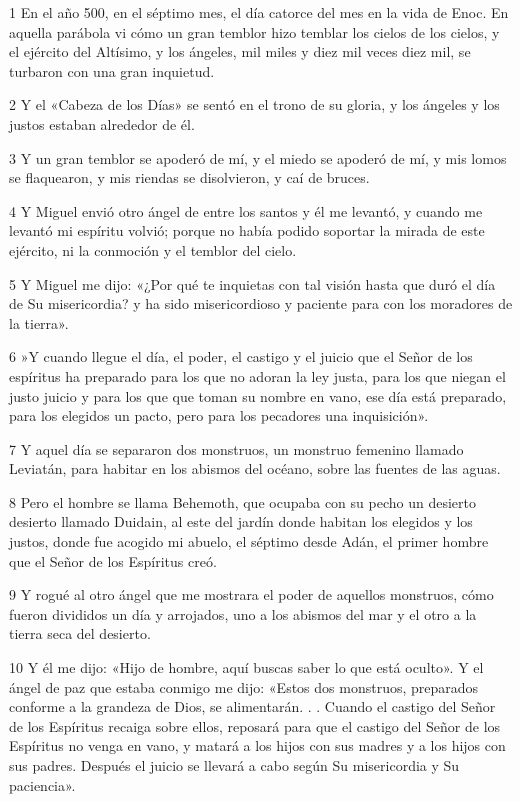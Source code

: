 \par 1 En el año 500, en el séptimo mes, el día catorce del mes en la vida de Enoc. En aquella parábola vi cómo un gran temblor hizo temblar los cielos de los cielos, y el ejército del Altísimo, y los ángeles, mil miles y diez mil veces diez mil, se turbaron con una gran inquietud.
\par 2 Y el «Cabeza de los Días» se sentó en el trono de su gloria, y los ángeles y los justos estaban alrededor de él.
\par 3 Y un gran temblor se apoderó de mí, y el miedo se apoderó de mí, y mis lomos se flaquearon, y mis riendas se disolvieron, y caí de bruces.
\par 4 Y Miguel envió otro ángel de entre los santos y él me levantó, y cuando me levantó mi espíritu volvió; porque no había podido soportar la mirada de este ejército, ni la conmoción y el temblor del cielo.
\par 5 Y Miguel me dijo: «¿Por qué te inquietas con tal visión hasta que duró el día de Su misericordia? y ha sido misericordioso y paciente para con los moradores de la tierra».
\par 6 »Y cuando llegue el día, el poder, el castigo y el juicio que el Señor de los espíritus ha preparado para los que no adoran la ley justa, para los que niegan el justo juicio y para los que que toman su nombre en vano, ese día está preparado, para los elegidos un pacto, pero para los pecadores una inquisición».
\par 7 Y aquel día se separaron dos monstruos, un monstruo femenino llamado Leviatán, para habitar en los abismos del océano, sobre las fuentes de las aguas.
\par 8 Pero el hombre se llama Behemoth, que ocupaba con su pecho un desierto desierto llamado Duidain, al este del jardín donde habitan los elegidos y los justos, donde fue acogido mi abuelo, el séptimo desde Adán, el primer hombre que el Señor de los Espíritus creó.
\par 9 Y rogué al otro ángel que me mostrara el poder de aquellos monstruos, cómo fueron divididos un día y arrojados, uno a los abismos del mar y el otro a la tierra seca del desierto.
\par 10 Y él me dijo: «Hijo de hombre, aquí buscas saber lo que está oculto». Y el ángel de paz que estaba conmigo me dijo: «Estos dos monstruos, preparados conforme a la grandeza de Dios, se alimentarán. . . Cuando el castigo del Señor de los Espíritus recaiga sobre ellos, reposará para que el castigo del Señor de los Espíritus no venga en vano, y matará a los hijos con sus madres y a los hijos con sus padres. Después el juicio se llevará a cabo según Su misericordia y Su paciencia».

